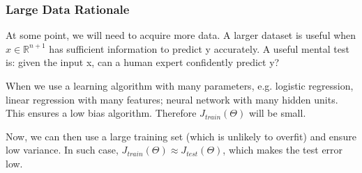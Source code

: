     \subsubsection{Large Data Rationale}
    At some point, we will need to acquire more data. A larger dataset is useful when $x\in\mathbb{R}^{n+1}$ has sufficient information to predict y accurately. 
    A useful mental test is: given the input x, can a human expert confidently predict y?

    When we use a learning algorithm with many parameters, e.g. logistic regression, linear regression with many features; neural network with many hidden units. This ensures a low bias algorithm. Therefore $J_{train} (\Theta)$ will be small. 
    \par Now, we can then use a large training set (which is unlikely to overfit) and ensure low variance. In such case, $J_{train} (\Theta) \approx J_{test}(\Theta)$, which makes the test error low. 


